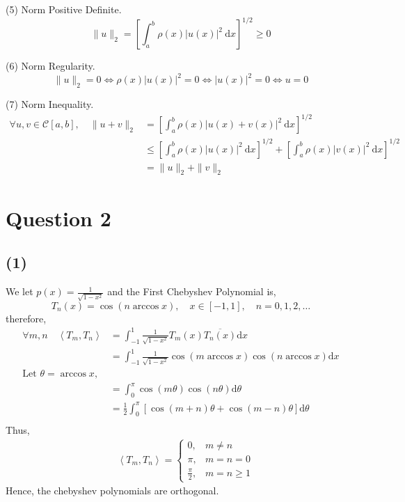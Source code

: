 \documentclass[11pt,a4paper]{article}
\theoremstyle{plain}
\begin{document}
\noindent(5) Norm Positive Definite.
\begin{equation}
\|u\|_2=\left[\int_a^b \rho(x)|u(x)|^2 \mathrm{~d} x\right]^{1 / 2} \geq 0
\end{equation}
\noindent

\noindent(6) Norm Regularity.
\begin{equation}
\|u\|_2=0 \Leftrightarrow \rho(x)|u(x)|^2=0 \Leftrightarrow|u(x)|^2=0 \Leftrightarrow u=0
\end{equation}

\noindent(7) Norm Inequality.
\begin{equation}
\begin{aligned}
\forall u, v \in \mathcal{C}[a, b], \quad\|u+v\|_2 & =\left[\int_a^b \rho(x)|u(x)+v(x)|^2 \mathrm{~d} x\right]^{1 / 2} \\
& \leq\left[\int_a^b \rho(x)|u(x)|^2 \mathrm{~d} x\right]^{1 / 2}+\left[\int_a^b \rho(x)|v(x)|^2 \mathrm{~d} x\right]^{1 / 2} \\
& =\|u\|_2+\|v\|_2
\end{aligned}
\end{equation}

\section*{Question 2}
\subsection*{(1)}
\noindent We let $p(x) = \frac{1}{\sqrt{1-x^2}}$ and the First Chebyshev Polynomial is,
\begin{equation}
T_n(x)=\cos (n \arccos x), \quad x \in[-1,1], \quad n=0,1,2, \ldots
\end{equation}
\noindent therefore,
\begin{equation}
\begin{aligned}
\forall m, n \quad\left\langle T_m, T_n\right\rangle & =\int_{-1}^1 \frac{1}{\sqrt{1-x^2}} T_m(x) \overline{T_n(x)} \mathrm{d} x \\
& =\int_{-1}^1 \frac{1}{\sqrt{1-x^2}} \cos (m \arccos x) \cos (n \arccos x) \mathrm{d} x \\
\text{Let }\theta=\arccos x,\\
& =\int_0^\pi \cos (m \theta) \cos (n \theta) \mathrm{d} \theta \\
& =\frac{1}{2} \int_0^\pi[\cos (m+n) \theta+\cos (m-n) \theta] \mathrm{d} \theta \\
\end{aligned}
\end{equation}
Thus,
\begin{equation}
    \begin{aligned}
        \quad\left\langle T_m, T_n\right\rangle = \begin{cases}0, & m \neq n \\
\pi, & m=n=0 \\
\frac{\pi}{2}, & m=n \geq 1\end{cases}
    \end{aligned}
\end{equation}
Hence, the chebyshev polynomials are orthogonal.
\end{document}
